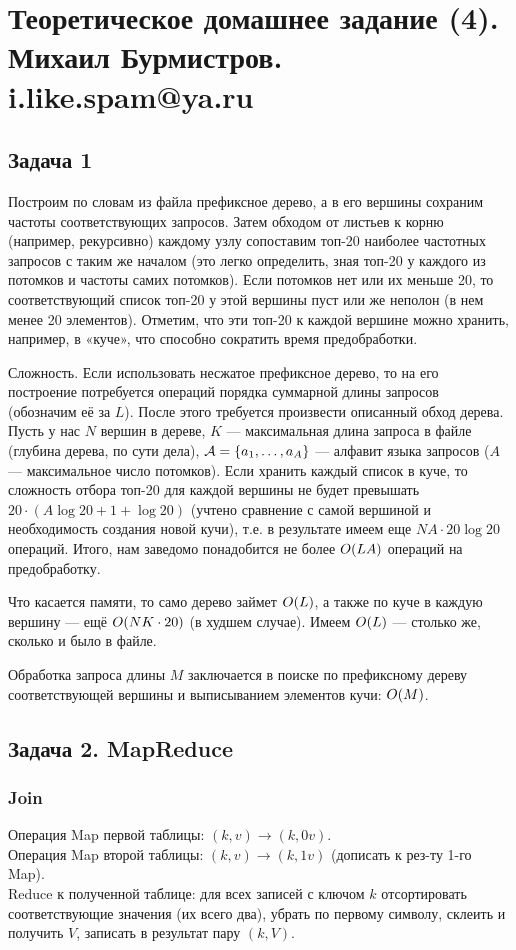\documentclass[12pt]{article}
\begin{document}
\section{Теоретическое домашнее задание (4). \\ Михаил Бурмистров. i.like.spam@ya.ru}

\subsection{Задача 1}
Построим по словам из файла префиксное дерево, а в его вершины сохраним частоты соответствующих запросов. 
Затем обходом от листьев к корню (например, рекурсивно) каждому узлу сопоставим топ-20 наиболее частотных запросов с таким же началом (это легко определить, зная топ-20 у каждого из потомков и частоты самих потомков). 
Если потомков нет или их меньше 20, то соответствующий список топ-20 у этой вершины пуст или же неполон (в нем менее 20 элементов). 
Отметим, что эти топ-20 к каждой вершине можно хранить, например, в «куче», что способно сократить время предобработки.

Сложность. Если использовать несжатое префиксное дерево, то на его построение потребуется операций порядка суммарной длины запросов (обозначим её за $L$). 
После этого требуется произвести описанный обход дерева. Пусть у нас $N$ вершин в дереве, $K$ --- максимальная длина запроса в файле (глубина дерева, по сути дела), 
$\mathcal{A}=\left\{a_1,\ldots,a_{A}\right\}$ --- алфавит языка запросов ($A$ --- максимальное число потомков). 
Если хранить каждый список в куче, то сложность отбора топ-20 для каждой вершины не будет превышать $20\cdot(A\log 20 + 1 + \log 20)$ (учтено сравнение с самой вершиной и необходимость создания новой кучи), 
т.е. в результате имеем еще $NA\cdot20\log20$ операций. Итого, нам заведомо понадобится не более $O\!\left(LA\right)$ операций на предобработку.

Что касается памяти, то само дерево займет $O\!\left(L\right)$, а также по куче в каждую вершину — ещё $O\!\left(NK\cdot20\right)$ (в худшем случае). 
Имеем $O\!\left(L\right)$ --- столько же, сколько и было в файле.

Обработка запроса длины $M$ заключается в поиске по префиксному дереву соответствующей вершины и выписыванием элементов кучи: $O\!\left(M\right)$.

\subsection{Задача 2. MapReduce}
\subsubsection{Join}
Операция Map первой таблицы: $(k,v) \to (k,0v)$.\\
Операция Map второй таблицы: $(k,v) \to (k,1v)$ (дописать к рез-ту 1-го Map).\\
Reduce к полученной таблице: для всех записей с ключом $k$ отсортировать соответствующие значения (их всего два), убрать по первому символу, склеить и получить $V$, записать в результат пару $(k,V)$.
\end{document}
